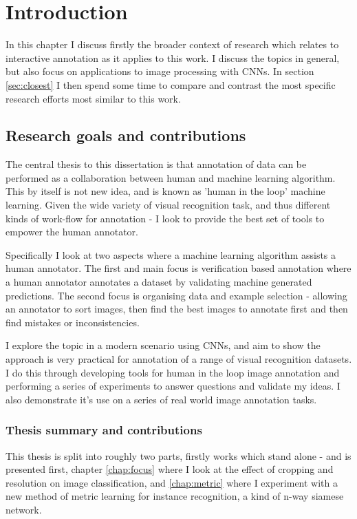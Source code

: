 


\chapter{Introduction}

In this chapter I discuss firstly the broader context of research which relates to interactive annotation as it applies to this work. I discuss the topics in general, but also focus on applications to image processing with \gls{CNN}s. In section \ref{sec:closest} I then spend some time to compare and contrast the most specific research efforts most similar to this work.

\section{Research goals and contributions}

The central thesis to this dissertation is that annotation of data can be performed as a collaboration between human and machine learning algorithm. This by itself is not new idea, and is known as 'human in the loop' machine learning. Given the wide variety of visual recognition task, and thus different kinds of work-flow for annotation - I look to provide the best set of tools to empower the human annotator.

Specifically I look at two aspects where a machine learning algorithm assists a human annotator. The first and main focus is verification based annotation where a human annotator annotates a dataset by validating machine generated predictions. The second focus is organising data and example selection - allowing an annotator to sort images, then find the best images to annotate first and then find mistakes or inconsistencies.

I explore the topic in a modern scenario using \gls{CNN}s, and aim to show the approach is very practical for annotation of a range of visual recognition datasets. I do this through developing tools for human in the loop image annotation and performing a series of experiments to answer questions and validate my ideas. I also demonstrate it's use on a series of real world image annotation tasks.


\subsection {Thesis summary and contributions}

This thesis is split into roughly two parts, firstly works which stand alone - and is presented first, chapter \ref{chap:focus} where I look at the effect of cropping and resolution on image classification, and \ref{chap:metric} where I experiment with a new method of metric learning for instance recognition, a kind of n-way siamese network. 

